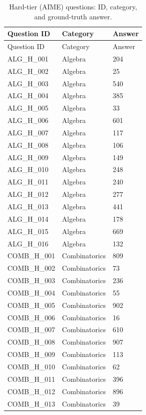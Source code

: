 \begin{longtable}{lll}
  \caption{Hard-tier (AIME) questions: ID, category, and ground-truth answer.} \label{tab:hard-tier-questions} \\
  \toprule
  Question ID & Category & Answer \\
  \midrule
  \endfirsthead
  \toprule
  Question ID & Category & Answer \\
  \midrule
  \endhead
  \bottomrule
  \endfoot
  ALG\_H\_001 & Algebra & 204 \\
  ALG\_H\_002 & Algebra & 25 \\
  ALG\_H\_003 & Algebra & 540 \\
  ALG\_H\_004 & Algebra & 385 \\
  ALG\_H\_005 & Algebra & 33 \\
  ALG\_H\_006 & Algebra & 601 \\
  ALG\_H\_007 & Algebra & 117 \\
  ALG\_H\_008 & Algebra & 106 \\
  ALG\_H\_009 & Algebra & 149 \\
  ALG\_H\_010 & Algebra & 248 \\
  ALG\_H\_011 & Algebra & 240 \\
  ALG\_H\_012 & Algebra & 277 \\
  ALG\_H\_013 & Algebra & 441 \\
  ALG\_H\_014 & Algebra & 178 \\
  ALG\_H\_015 & Algebra & 669 \\
  ALG\_H\_016 & Algebra & 132 \\
  COMB\_H\_001 & Combinatorics & 809 \\
  COMB\_H\_002 & Combinatorics & 73 \\
  COMB\_H\_003 & Combinatorics & 236 \\
  COMB\_H\_004 & Combinatorics & 55 \\
  COMB\_H\_005 & Combinatorics & 902 \\
  COMB\_H\_006 & Combinatorics & 16 \\
  COMB\_H\_007 & Combinatorics & 610 \\
  COMB\_H\_008 & Combinatorics & 907 \\
  COMB\_H\_009 & Combinatorics & 113 \\
  COMB\_H\_010 & Combinatorics & 62 \\
  COMB\_H\_011 & Combinatorics & 396 \\
  COMB\_H\_012 & Combinatorics & 896 \\
  COMB\_H\_013 & Combinatorics & 39 \\

\end{longtable}
